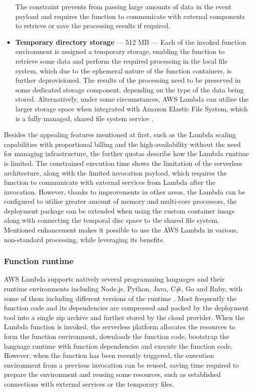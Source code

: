 \begin{itemize}
   The constraint prevents from passing large amounts of data in the event payload and requires the function to communicate with external components to retrieve or save the processing results if required.
   \item \textbf{Temporary directory storage} --- 512 MB --- Each of the invoked function environment is assigned a temporary storage, enabling the function to retrieve some data and perform the required processing in the local file system, which due to the ephemeral nature of the function containers, is further deprovisioned. The results of the processing need to be preserved in some dedicated storage component, depending on the type of the data being stored. Alternatively, under some circumstances, AWS Lambda can utilise the larger storage space when integrated with Amazon Elastic File System, which is a fully managed, shared file system service \cite{AWSLambdaEFS}.
\end{itemize}

Besides the appealing features mentioned at first, such as the Lambda scaling capabilities with proportional billing and the high-availability without the need for managing infrastructure, the further quotas describe how the Lambda runtime is limited.
The constrained execution time shows the limitation of the serverless architecture, along with the limited invocation payload, which requires the function to communicate with external services from Lambda after the invocation. However, thanks to improvements in other areas, the Lambda can be configured to utilise greater amount of memory and multi-core processors, the deployment package can be extended when using the custom container image along with connecting the temporal disc space to the shared file system.
Mentioned enhancement makes it possible to use the AWS Lambda in various, non-standard processing, while leveraging its benefits.

\subsubsection{Function runtime} \label{chapter:lambda-custom-runtimes}

AWS Lambda supports natively several programming languages and their runtime environments including Node.js, Python, Java, C\#, Go and Ruby, with some of them including different versions of the runtime \cite{AWSLambdaRuntimes}. Most frequently the function code and its dependencies are compressed and packed by the deployment tool into a single zip archive and further stored by the cloud provider. When the Lambda function is invoked, the serverless platform allocates the resources to form the function environment, downloads the function code, bootstrap the language runtime with function dependencies and execute the function code. However, when the function has been recently triggered, the execution environment from a previous invocation can be reused, saving time required to prepare the environment and reusing some resources, such as established connections with external services or the temporary files.

